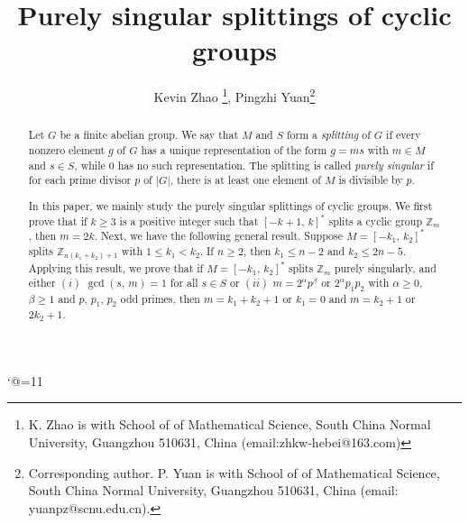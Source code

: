 \documentclass[12pt]{article}
\newtheorem{open problem}{Open problem}[section]
\begin{document}
\title{ Purely singular splittings of  cyclic groups}


\author{Kevin Zhao \thanks{K. Zhao is with School of  of Mathematical Science, South China Normal University,  Guangzhou 510631, China (email:zhkw-hebei@163.com)},
Pingzhi Yuan\thanks{Corresponding author. P. Yuan is with School of  of Mathematical Science, South China Normal University,  Guangzhou 510631, China (email: yuanpz@scnu.edu.cn).} }

\date{}
\maketitle
 \edef \tmp {\the \catcode`@}
   \catcode`@=11
   \def \@thefnmark {}





    \begin{abstract} Let $G$ be a finite abelian group.
  We  say that $M$ and $S$ form a \textsl{splitting} of $G$ if every nonzero element $g$ of $G$ has a unique representation of the form $g=ms$ with $m\in M$ and $s\in S$, while $0$ has no such representation.
The splitting is called \textit{purely singular}
if for each prime divisor $p$ of $|G|$, there is at least one element of $M$ is divisible by $p$.

  In this paper, we mainly study the purely singular splittings of cyclic groups.  We first prove that if $k\ge3$ is a positive integer such that $[-k+1, \,k]^*$ splits a cyclic group $\mathbb{Z}_m$, then $m=2k$. Next, we have the following general result. Suppose  $M=[-k_1, \,k_2]^*$ splits $\mathbb{Z}_{n(k_1+k_2)+1}$ with $1\leq k_1< k_2$.
If $n\geq 2$, then $k_1\leq n-2$ and $k_2\leq 2n-5$. Applying this result, we prove that if $M=[-k_1, \,k_2]^*$ splits $\mathbb{Z}_m$ purely singularly, and  either $(i)$ $\gcd(s, \,m)=1$ for all $s\in S$ or $(ii)$ $m=2^{\alpha}p^{\beta}$ or $2^{\alpha}p_1p_2$
with $\alpha\geq 0$, $\beta\geq 1$ and $p$, $p_1$, $p_2$ odd primes,
then $m=k_1+k_2+1$ or $k_1=0$ and $m=k_2+1$ or $2k_2+1$.


\end{abstract}
\end{document}

